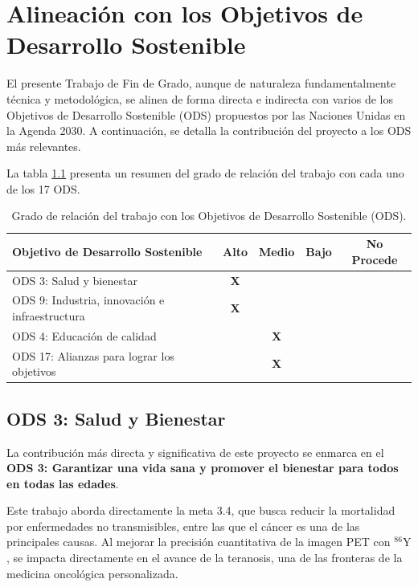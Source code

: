 \chapter[Alineación con los ODS]{Alineación con los Objetivos de Desarrollo Sostenible}
\label{cap:ods}

El presente Trabajo de Fin de Grado, aunque de naturaleza fundamentalmente técnica y metodológica, se alinea de forma directa e indirecta con varios de los Objetivos de Desarrollo Sostenible (ODS) propuestos por las Naciones Unidas en la Agenda 2030. A continuación, se detalla la contribución del proyecto a los ODS más relevantes.

La tabla \ref{tab:ods} presenta un resumen del grado de relación del trabajo con cada uno de los 17 ODS.

\begin{table}[htbp]
    \centering
    \caption{Grado de relación del trabajo con los Objetivos de Desarrollo Sostenible (ODS).}
    \label{tab:ods}
    \begin{tabular}{|l|c|c|c|c|}
    \hline
    \textbf{Objetivo de Desarrollo Sostenible} & \textbf{Alto} & \textbf{Medio} & \textbf{Bajo} & \textbf{No Procede} \\
    \hline
    ODS 3: Salud y bienestar & \textbf{X} & & & \\
    \hline
    ODS 9: Industria, innovación e infraestructura & \textbf{X} & & & \\
    \hline
    ODS 4: Educación de calidad & & \textbf{X} & & \\
    \hline
    ODS 17: Alianzas para lograr los objetivos & & \textbf{X} & & \\
    \hline
    \end{tabular}
\end{table}

\section{ODS 3: Salud y Bienestar}
\label{sec:ods3}

La contribución más directa y significativa de este proyecto se enmarca en el \textbf{ODS 3: Garantizar una vida sana y promover el bienestar para todos en todas las edades}.

Este trabajo aborda directamente la meta 3.4, que busca reducir la mortalidad por enfermedades no transmisibles, entre las que el cáncer es una de las principales causas. Al mejorar la precisión cuantitativa de la imagen PET con $^{86}\text{Y}$, se impacta directamente en el avance de la teranosis, una de las fronteras de la medicina oncológica personalizada.


